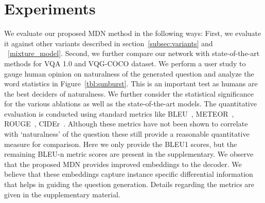 \documentclass[11pt,a4paper]{article}
\begin{document}
\section{Experiments}
We evaluate our proposed MDN method in the following ways: First, we evaluate it against other variants described in section~\ref{subsec:variants} and ~\ref{mixture_model}. Second, we further compare our network with state-of-the-art methods  for VQA 1.0 and VQG-COCO dataset.
We perform a user study to gauge human opinion on naturalness of the generated question and analyze the word statistics in Figure~\ref{tbl:sunburst}. This is an important test as humans are the best deciders of naturalness. We further consider the statistical significance for the various ablations as well as the state-of-the-art models. The quantitative evaluation is conducted using standard metrics like BLEU~\cite{Papineni_ACL2002}, METEOR~\cite{Banerjee_ACL2005}, ROUGE~\cite{Lin_ACL2004}, CIDEr~\cite{Vedantam_CVPR2015}. Although these metrics have not been shown to correlate with `naturalness' of the question these still provide a reasonable quantitative measure for comparison. Here we only provide the BLEU1 scores, but the remaining BLEU-n metric scores are present in the supplementary. We observe that the proposed MDN provides improved embeddings to the decoder. We believe that these embeddings capture instance specific differential information that helps in guiding the question generation. Details regarding the metrics  are given in the supplementary material.



\label{sec:results}
\end{document}
